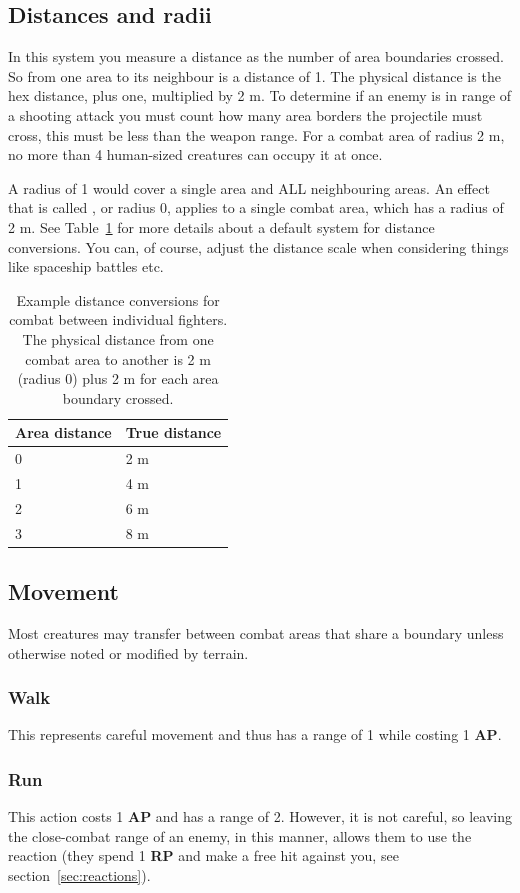 \documentclass[a4paper,10pt,oneside]{book}
\newcommand{\textlf}[1]{\textbf{\titlecap{#1}}}
\newcommand{\textlfirst}[1]{\textbf{\textit{\titlecap{#1}}}}
\newcommand{\dist}{2 m}
\begin{document}
\subsection{Distances and radii}
In this system you measure a distance as the number of area boundaries crossed. So from one area to its neighbour is a distance of 1. The physical distance is the hex distance, plus one, multiplied by \dist{}. To determine if an enemy is in range of a shooting attack you must count how many area borders the projectile must cross, this must be less than the weapon range. For a combat area of radius \dist{}, no more than 4 human-sized creatures can occupy it at once.

A radius of 1 would cover a single area and ALL neighbouring areas. An effect that is called \textlfirst{adjacent}, or radius 0, applies to a single combat area, which has a radius of \dist{}. See Table~\ref{tab:distances} for more details about a default system for distance conversions. You can, of course, adjust the distance scale when considering things like spaceship battles etc. 
\begin{table}[ht!]
	\centering
	\begin{tabular}{|l|l|}
		\hline
		Area distance & True distance \\
		\hline
		0 & \dist{}\\
		1 & 4 m \\
		2 & 6 m \\
		3 & 8 m\\
		\hline
	\end{tabular}
	\caption{Example distance conversions for combat between individual fighters. The physical distance from one combat area to another is \dist{} (radius 0) plus \dist{} for each area boundary crossed.}
	\label{tab:distances}
\end{table} 


\subsection{Movement}
Most creatures may transfer between combat areas that share a boundary unless otherwise noted or modified by terrain.

\subsubsection{Walk}
This represents careful movement and thus has a range of 1 while costing 1 \textbf{AP}.

\subsubsection{Run}
This action costs 1 \textbf{AP} and has a range of 2. However, it is not careful, so leaving the close-combat range of an enemy, in this manner, allows them to use the \textlf{exploit weakness} reaction (they spend 1 \textbf{RP} and make a free hit against you, see section~\ref{sec:reactions}).
\end{document}
